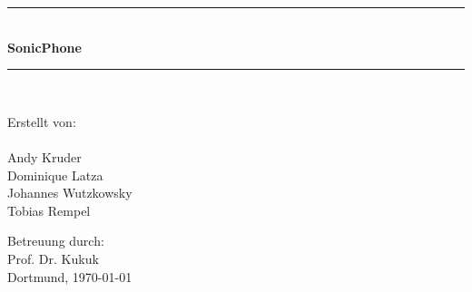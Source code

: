 
\newcommand{\HRule}{\rule{\linewidth}					{0.5mm}}

\begin{titlepage}
	\begin{center}

\HRule \\[0.1cm]

\textbf{\large{
SonicPhone
}}

\HRule \\[0.1cm]
\vspace{5cm}

\large{}
Erstellt von:\\
~\\
Andy Kruder\\
Dominique Latza\\
Johannes Wutzkowsky\\
Tobias Rempel
\vspace{1cm}



\vspace{2.5cm}
Betreuung durch:\\
Prof. Dr. Kukuk\\
\vspace{1.3cm}
Dortmund, \today
		
\end{center}
\end{titlepage}